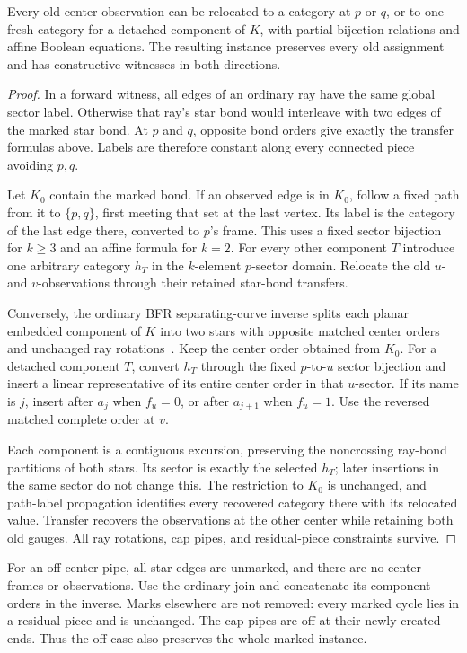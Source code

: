 \begin{lemma}
\label{cse:join}
Every old center observation can be relocated to a category at $p$ or
$q$, or to one fresh category for a detached component of $K$, with
partial-bijection relations and affine Boolean equations. The resulting
instance preserves every old assignment and has constructive witnesses
in both directions.
\end{lemma}
\begin{proof}
In a forward witness, all edges of an ordinary ray have the same global
sector label. Otherwise that ray's star bond would interleave with two
edges of the marked star bond. At $p$ and $q$, opposite bond orders give
exactly the transfer formulas above. Labels are therefore constant along
every connected piece avoiding $p,q$.

Let $K_0$ contain the marked bond. If an observed edge is in $K_0$, follow
a fixed path from it to $\{p,q\}$, first meeting that set at the last
vertex. Its label is the category of the last edge there, converted to
$p$'s frame. This uses a fixed sector bijection for $k\ge3$ and an affine
formula for $k=2$. For every other component $T$ introduce one arbitrary
category $h_T$ in the $k$-element $p$-sector domain. Relocate the old
$u$- and $v$-observations through their retained star-bond transfers.

Conversely, the ordinary BFR separating-curve inverse splits each planar
embedded component of $K$ into two stars with opposite matched center
orders and unchanged ray rotations~\cite{bfr}. Keep the center order
obtained from $K_0$. For a detached component $T$, convert $h_T$ through
the fixed $p$-to-$u$ sector bijection and insert a linear representative
of its entire center order in that $u$-sector. If its name is $j$, insert
after $a_j$ when $f_u=0$, or after $a_{j+1}$ when $f_u=1$. Use the reversed
matched complete order at $v$.

Each component is a contiguous excursion, preserving the noncrossing
ray-bond partitions of both stars. Its sector is exactly the selected
$h_T$; later insertions in the same sector do not change this. The
restriction to $K_0$ is unchanged, and path-label propagation identifies
every recovered category there with its relocated value. Transfer recovers
the observations at the other center while retaining both old gauges.
All ray rotations, cap pipes, and residual-piece constraints survive.
\end{proof}

For an off center pipe, all star edges are unmarked, and there are no
center frames or observations. Use the ordinary join and concatenate its
component orders in the inverse. Marks elsewhere are not removed: every
marked cycle lies in a residual piece and is unchanged. The cap pipes are
off at their newly created ends. Thus the off case also preserves the
whole marked instance.

